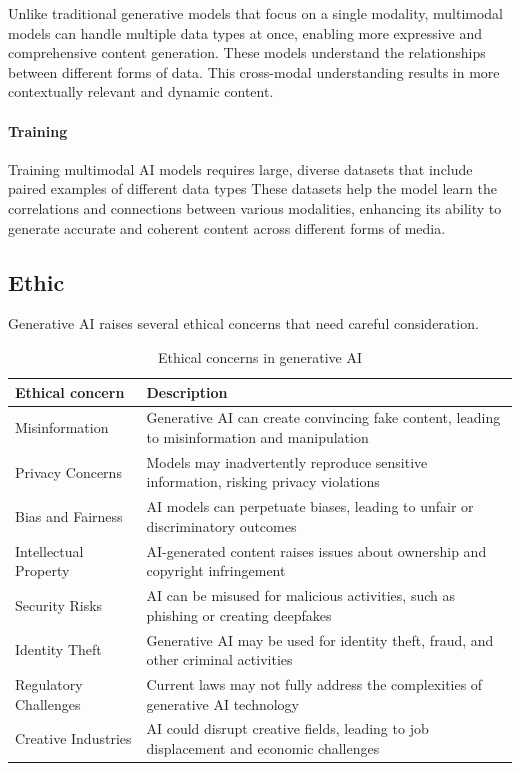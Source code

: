 Unlike traditional generative models that focus on a single modality, multimodal models can handle multiple data types at once, enabling more expressive and comprehensive content generation.
These models understand the relationships between different forms of data.
This cross-modal understanding results in more contextually relevant and dynamic content.

\paragraph*{Training}
Training multimodal AI models requires large, diverse datasets that include paired examples of different data types
These datasets help the model learn the correlations and connections between various modalities, enhancing its ability to generate accurate and coherent content across different forms of media.

\subsection{Ethic}
Generative AI raises several ethical concerns that need careful consideration. 

\renewcommand{\arraystretch}{1.5}
\begin{table}[!ht]
    \centering
    \begin{tabular}{|l|p{10cm}|}
    \hline
    \textbf{Ethical concern} & \textbf{Description} \\
    \hline
    Misinformation & Generative AI can create convincing fake content, leading to misinformation and manipulation \\
    \hline
    Privacy Concerns & Models may inadvertently reproduce sensitive information, risking privacy violations \\
    \hline
    Bias and Fairness & AI models can perpetuate biases, leading to unfair or discriminatory outcomes \\
    \hline
    Intellectual Property & AI-generated content raises issues about ownership and copyright infringement \\
    \hline
    Security Risks & AI can be misused for malicious activities, such as phishing or creating deepfakes \\
    \hline
    Identity Theft & Generative AI may be used for identity theft, fraud, and other criminal activities \\
    \hline
    Regulatory Challenges & Current laws may not fully address the complexities of generative AI technology \\
    \hline
    Creative Industries & AI could disrupt creative fields, leading to job displacement and economic challenges \\
    \hline
    \end{tabular}
    \caption{Ethical concerns in generative AI}
\end{table}
\renewcommand{\arraystretch}{1}

